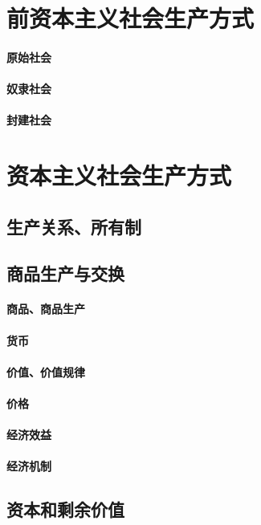 \documentclass[UTF8]{../../RepresentationUniverse}
\begin{document}
\chapter{前资本主义社会生产方式}
    \subsubsection{原始社会}
    \subsubsection{奴隶社会}
    \subsubsection{封建社会}




\chapter{资本主义社会生产方式}
\section{生产关系、所有制}
\section{商品生产与交换}
    \subsubsection{商品、商品生产}
    \subsubsection{货币}
    \subsubsection{价值、价值规律}
    \subsubsection{价格}
    \subsubsection{经济效益}
    \subsubsection{经济机制}
\section{资本和剩余价值}
\end{document}
